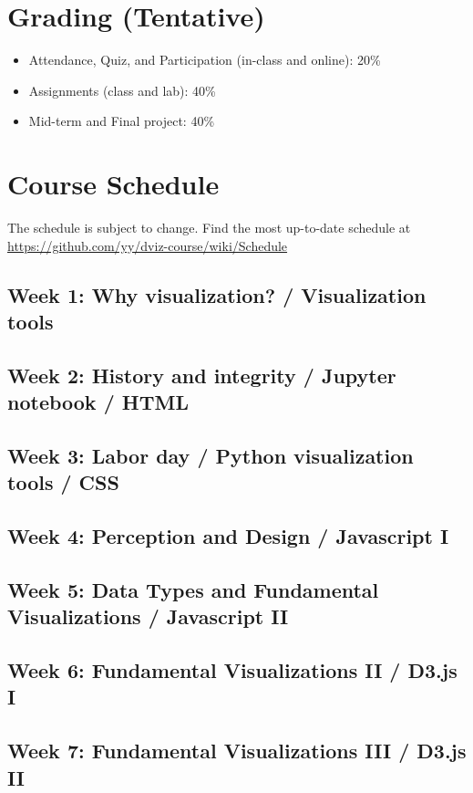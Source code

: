 \documentclass[11pt,article,oneside]{memoir}
\begin{document}
\section{Grading (Tentative)}
\label{sec:grading_tentative_}

\begin{itemize}

\item Attendance, Quiz, and Participation (in-class and online): 20\%

\item Assignments (class and lab): 40\%

\item Mid-term and Final project: 40\%


\end{itemize}

\section{Course Schedule}

The schedule is subject to change. Find the most up-to-date schedule at 
\url{https://github.com/yy/dviz-course/wiki/Schedule}

\subsection{Week 1: Why visualization? / Visualization tools}
\subsection{Week 2: History and integrity / Jupyter notebook / HTML}
\subsection{Week 3: Labor day / Python visualization tools / CSS}
\subsection{Week 4: Perception and Design / Javascript I}
\subsection{Week 5: Data Types and Fundamental Visualizations / Javascript II}
\subsection{Week 6: Fundamental Visualizations II / D3.js I} 
\subsection{Week 7: Fundamental Visualizations III / D3.js II}
\end{document}
